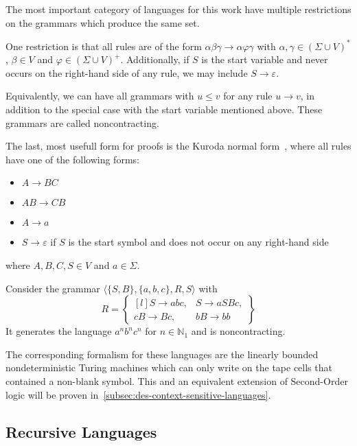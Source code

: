 The most important category of languages for this work have multiple restrictions on the grammars which produce the same set.

One restriction is that all rules are of the form $\alpha\beta\gamma \to \alpha\varphi\gamma$ with $\alpha, \gamma \in (\Sigma \cup V)^{*}$, $\beta \in V$ and $\varphi \in (\Sigma \cup V)^{+}$.
Additionally, if $S$ is the start variable and never occurs on the right-hand side of any rule, we may include $S \to \varepsilon$.

Equivalently, we can have all grammars with $u \leq v$ for any rule $u \to v$, in addition to the special case with the start variable mentioned above.
These grammars are called noncontracting.

The last, most usefull form for proofs is the Kuroda normal form~\cite{Pettorossi2022}, where all rules have one of the following forms:
\begin{itemize}
    \setlength\itemsep{0.2em}
    \item $A \to BC$
    \item $AB \to CB$
    \item $A \to a$
    \item $S \to \varepsilon$ if $S$ is the start symbol and does not occur on any right-hand side
\end{itemize}
where $A, B, C, S \in V$ and $a \in \Sigma$.

\begin{exmp}
    Consider the grammar $\langle \{S, B\}, \{a, b, c\}, R, S \rangle$ with
    \[
        R = \begin{Bmatrix*}[l]
               S \to abc, &S \to aSBc, \\
               cB \to Bc, &bB \to bb
        \end{Bmatrix*}
    \]
    It generates the language $a^{n}b^{n}c^{n}$ for $n \in \mathbb{N}_{1}$ and is noncontracting.
\end{exmp}

The corresponding formalism for these languages are the linearly bounded nondeterministic Turing machines which can only write on the tape cells that contained a non-blank symbol.
This and an equivalent extension of Second-Order logic will be proven in~\cref{subsec:des-context-sensitive-languages}.

\subsection{Recursive Languages}\label{subsec:recursive-languages}

